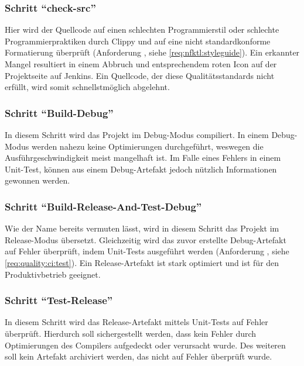 \subsubsection{Schritt \enquote{check-src}}
Hier wird der Quellcode auf einen schlechten Programmierstil oder schlechte Programmierpraktiken durch Clippy und auf eine nicht standardkonforme Formatierung überprüft (Anforderung , siehe \autoref{req:nfktl:styleguide}).
Ein erkannter Mangel resultiert in einem Abbruch und entsprechendem roten Icon auf der Projektseite auf Jenkins.
Ein Quellcode, der diese Qualitätsstandards nicht erfüllt, wird somit schnellstmöglich abgelehnt.

\subsubsection{Schritt \enquote{Build-Debug}}
In diesem Schritt wird das Projekt im Debug-Modus compiliert.
In einem Debug-Modus werden nahezu keine Optimierungen durchgeführt, weswegen die Ausführgeschwindigkeit meist mangelhaft ist.
Im Falle eines Fehlers in einem Unit-Test, können aus einem Debug-Artefakt jedoch nützlich Informationen gewonnen werden.

\subsubsection{Schritt \enquote{Build-Release-And-Test-Debug}}
Wie der Name bereits vermuten lässt, wird in diesem Schritt das Projekt im Release-Modus übersetzt.
Gleichzeitig wird das zuvor erstellte Debug-Artefakt auf Fehler überprüft, indem Unit-Tests ausgeführt werden (Anforderung , siehe \autoref{req:quality:ci:test}).
Ein Release-Artefakt ist stark optimiert und ist für den Produktivbetrieb geeignet.

\subsubsection{Schritt \enquote{Test-Release}}

In diesem Schritt wird das Release-Artefakt mittels Unit-Tests auf Fehler überprüft.
Hierdurch soll sichergestellt werden, dass kein Fehler durch Optimierungen des Compilers aufgedeckt oder verursacht wurde.
Des weiteren soll kein Artefakt archiviert werden, das nicht auf Fehler überprüft wurde.


